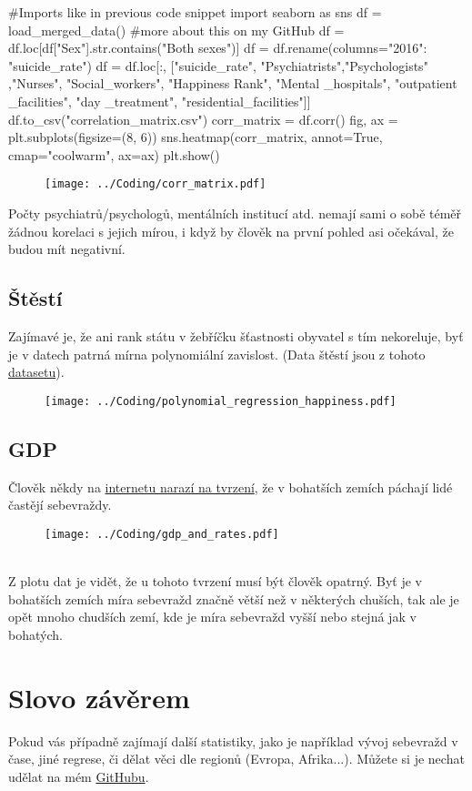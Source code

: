 \documentclass[12pt]{article}
\begin{document}
\begin{python}
#Imports like in previous code snippet
import seaborn as sns
df = load_merged_data() #more about this on my GitHub
df = df.loc[df["Sex"].str.contains("Both sexes")]
df = df.rename(columns={"2016": "suicide_rate"})
df = df.loc[:, ["suicide_rate", "Psychiatrists","Psychologists" ,"Nurses", "Social_workers", "Happiness Rank", "Mental _hospitals", "outpatient _facilities", "day _treatment", "residential_facilities"]]
df.to_csv("correlation_matrix.csv")
corr_matrix = df.corr()
fig, ax = plt.subplots(figsize=(8, 6))
sns.heatmap(corr_matrix, annot=True, cmap="coolwarm", ax=ax)
plt.show()
\end{python}
\newpage
\begin{figure}[hbt]
  \centering
  \texttt{[image: ../Coding/corr\_matrix.pdf]}
  \label{fig:plot}
\end{figure}

Počty psychiatrů/psychologů, mentálních institucí atd. nemají sami o sobě téměř žádnou korelaci s jejich mírou, i když by člověk na první pohled asi očekával, že budou mít negativní. 
\subsection{Štěstí}
Zajímavé je, že ani rank státu v žebříčku šťastnosti obyvatel s tím nekoreluje, byť je v datech patrná mírna polynomiální zavislost. (Data štěstí jsou z tohoto \href{https://www.kaggle.com/datasets/unsdsn/world-happiness}{datasetu}). 

\begin{figure}[hbt]
  \centering
  \texttt{[image: ../Coding/polynomial\_regression\_happiness.pdf]}
  \label{fig:plot}
\end{figure}

\subsection{GDP} Člověk někdy na \href{https://www.youtube.com/watch?v=brEU5j4IsxU}{internetu narazí na tvrzení}, že v bohatších zemích páchají lidé častějí sebevraždy.
\begin{figure}[hbt]
  \centering
  \texttt{[image: ../Coding/gdp\_and\_rates.pdf]}
  \label{fig:plot}
\end{figure} \\
Z plotu dat je vidět, že u tohoto tvrzení musí být člověk opatrný. Byť je v bohatších zemích míra sebevražd značně větší než v některých chuších, tak ale je opět mnoho chudších zemí, kde je míra sebevražd vyšší nebo stejná jak v bohatých.

\section{Slovo závěrem}
Pokud vás případně zajímají další statistiky, jako je například vývoj sebevražd v čase, jiné regrese, či dělat věci dle regionů (Evropa, Afrika...). Můžete si je nechat udělat na mém \href{https://github.com/Desperadus/PaST-Zapoctak}{GitHubu}.

\renewcommand\refname{Reference}


\end{document}
